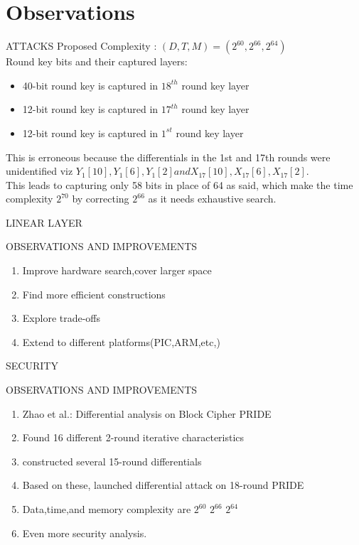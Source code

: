 \section{Observations}

\begin{frame}{ATTACKS}
    Proposed Complexity : $(D,T,M)=(2^{60},2^{66},2^{64})$\\
    Round key bits and their captured layers:
    \begin{itemize}
        \item 40-bit round key is captured in $18^{th}$ round key layer
        \item 12-bit round key is captured in $17^{th}$ round key layer
        \item 12-bit round key is captured in $1^{st}$ round key layer
    \end{itemize}
    This is erroneous because the differentials in the 1st and 17th rounds were unidentified viz $Y_1[10], Y_1[6], Y_1[2] and X_{17}[10], X_{17}[6], X_{17}[2]$.\\
    This leads to capturing only 58 bits in place of 64 as said, which make the time complexity $2^{70}$ by correcting $2^{66}$ as it needs exhaustive search.
\end{frame}

\begin{frame}{LINEAR LAYER}
\begin{block}{OBSERVATIONS AND IMPROVEMENTS}
\begin{enumerate}
    \item Improve hardware search,cover larger space
    \item Find more efficient constructions
    \item Explore trade-offs
    \item Extend to different platforms(PIC,ARM,etc,)
\end{enumerate}

\end{block}

\end{frame}
\begin{frame}{SECURITY}
\begin{block}{OBSERVATIONS AND IMPROVEMENTS}
\begin{enumerate}
    \item Zhao et al.: Differential analysis on Block Cipher PRIDE
    \item Found 16 different 2-round iterative characteristics
    \item constructed several 15-round differentials
    \item Based on these, launched differential attack on 18-round PRIDE
    \item Data,time,and memory complexity are $2^{60}$ $2^{66}$ $2^{64}$
    \item Even more security analysis.
\end{enumerate}

\end{block}

\end{frame}
